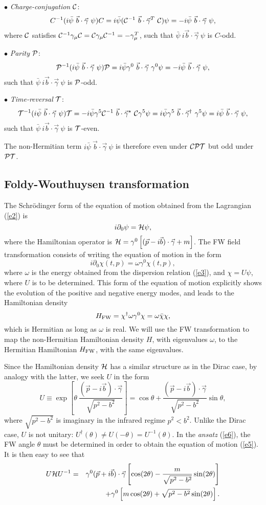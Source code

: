 \documentclass[11pt,prd,aps,amssymb,amsmath,tightenlines,showpacs]{revtex4}
\newcommand{\be}{\begin{equation}}
\newcommand{\ee}{\end{equation}}
\newcommand{\bea}{\begin{eqnarray}}
\newcommand{\eea}{\end{eqnarray}}
\newcommand{\cP}{{\cal P}}
\newcommand{\cT}{{\cal T}}
\newcommand{\cC}{{\cal C}}
\newcommand{\cH}{{\cal H}}
\newcommand{\cPT}{{\cal PT}}
\newcommand{\cCPT}{{\cal CPT}}
\begin{document}
$\bullet$ {\it Charge-conjugation} $\cC$:
$$C^{-1}(i\bar\psi~\vec b\cdot\vec\gamma~\psi)C=i\bar\psi({\cal C}^{-1}~\vec
b\cdot\vec\gamma^T~{\cal C})\psi=-i\bar\psi~\vec b\cdot\vec\gamma~\psi,$$
where $\cC$ satisfies $\cC^{-1}\gamma_\mu\cC=\cC\gamma_\mu\cC^{-1}=-
\gamma_\mu^T$, such that $\bar\psi~i\vec b\cdot\vec\gamma~\psi$ is $C$-odd.

$\bullet$ {\it Parity} $\cP$:
$$\cP^{-1}(i\bar\psi~\vec b\cdot\vec\gamma~\psi)\cP=i\bar\psi\gamma^0~\vec b
\cdot\vec\gamma~\gamma^0\psi=-i\bar\psi~\vec b\cdot\vec\gamma~\psi,$$
such that $\bar\psi~i\vec b\cdot\vec\gamma~\psi$ is $\cP$-odd.

$\bullet$ {\it Time-reversal} $\cT$:
$$\cT^{-1}(i\bar\psi~\vec b\cdot\vec\gamma~\psi)\cT=-i\bar\psi\gamma^5\cC^{-1}~
\vec b\cdot\vec\gamma^\star~\cC\gamma^5\psi=i\bar\psi\gamma^5~\vec b\cdot\vec
\gamma^\dag~\gamma^5\psi=i\bar\psi~\vec b\cdot\vec\gamma~\psi,$$
such that $\bar\psi~i\vec b\cdot\vec\gamma~\psi$ is $\cT$-even.

The non-Hermitian term $i\bar\psi~\vec b\cdot\vec\gamma~\psi$ is therefore even
under $\cCPT$ but odd under $\cPT$.

\subsection{Foldy-Wouthuysen transformation}
The Schr\"odinger form of the equation of motion obtained from the Lagrangian
(\ref{e2}) is
$$i\partial_0\psi=\cH\psi,$$
where the Hamiltonian operator is $\cH=\gamma^0\left[(\vec p-i\vec b)\cdot\vec
\gamma+m\right]$. The FW field transformation \cite{r5} consists of writing the
equation of motion in the form
\be
i\partial_0\chi(t,p)=\omega\gamma^0\chi(t,p),
\label{e5}
\ee 
where $\omega$ is the energy obtained from the dispersion relation (\ref{e3}),
and $\chi=U\psi$, where $U$ is to be determined. This form of the equation of
motion explicitly shows the evolution of the positive and negative energy
modes, and leads to the Hamiltonian density
$$H_{\rm FW}=\chi^\dag\omega\gamma^0\chi=\omega\bar\chi\chi,$$
which is Hermitian as long as $\omega$ is real. We will use the FW
transformation to map the non-Hermitian Hamiltonian density $H$, with
eigenvalues $\omega$, to the Hermitian Hamiltonian $H_{\rm FW}$, with the same
eigenvalues.

Since the Hamiltonian density $\cH$ has a similar structure as in the Dirac
case, by analogy with the latter, we seek $U$ in the form
\be
U\equiv\exp\left[\theta~\frac{(\vec p-i\vec b)\cdot\vec\gamma}{\sqrt{p^2-b^2}}
\right]=\cos\theta+\frac{\left(\vec p-i\vec b\right)\cdot\vec\gamma}{\sqrt{p^2
-b^2}}\sin\theta,
\label{e6}
\ee
where $\sqrt{p^2-b^2}$ is imaginary in the infrared regime $p^2<b^2$. Unlike the
Dirac case, $U$ is not unitary: $U^\dag(\theta)\ne U(-\theta)=U^{-1}(\theta)$.
In the {\it ansatz} (\ref{e6}), the FW angle $\theta$ must be determined in
order to obtain the equation of motion (\ref{e5}). It is then easy to see that
\bea
U\cH U^{-1}&=&\gamma^0(\vec p+i\vec b)\cdot\vec\gamma\left[\cos(2\theta)-
\frac{m}{\sqrt{p^2-b^2}}\sin(2\theta)\right]\nonumber\\
&&+\gamma^0\left[m\cos(2\theta)+\sqrt{p^2-b^2}\sin(2\theta)\right].\nonumber
\eea
\end{document}
